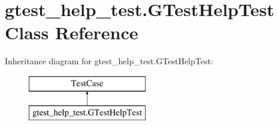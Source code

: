 \hypertarget{classgtest__help__test_1_1_g_test_help_test}{}\section{gtest\+\_\+help\+\_\+test.\+G\+Test\+Help\+Test Class Reference}
\label{classgtest__help__test_1_1_g_test_help_test}
Inheritance diagram for gtest\+\_\+help\+\_\+test.\+G\+Test\+Help\+Test\+:\begin{figure}[H]
\begin{center}
\leavevmode
\includegraphics[height=2.000000cm]{classgtest__help__test_1_1_g_test_help_test}
\end{center}
\end{figure}
